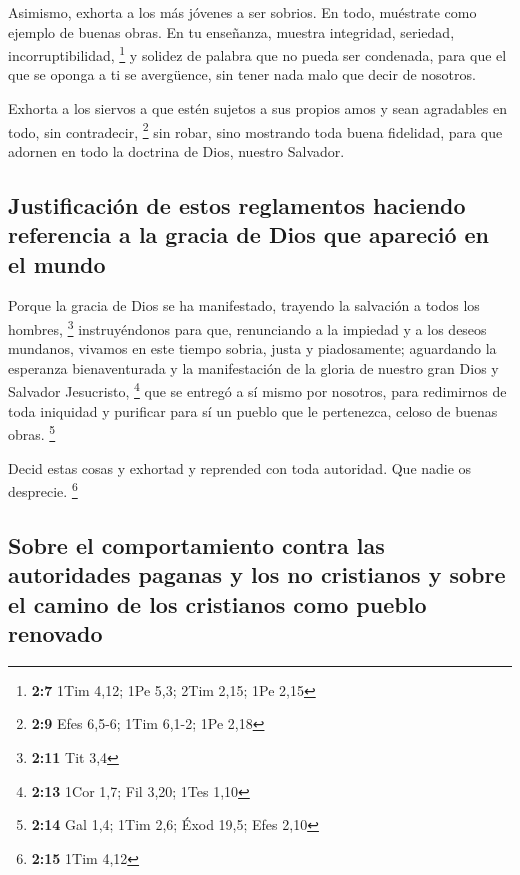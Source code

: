  Asimismo, exhorta a los más jóvenes a ser sobrios.
 En todo, muéstrate como ejemplo de buenas obras. En tu
enseñanza, muestra integridad, seriedad, incorruptibilidad, \footnote{\textbf{2:7}
  1Tim 4,12; 1Pe 5,3; 2Tim 2,15; 1Pe 2,15}  y solidez de
palabra que no pueda ser condenada, para que el que se oponga a ti se
avergüence, sin tener nada malo que decir de nosotros.

 Exhorta a los siervos a que estén sujetos a sus propios
amos y sean agradables en todo, sin contradecir, \footnote{\textbf{2:9}
  Efes 6,5-6; 1Tim 6,1-2; 1Pe 2,18}  sin robar, sino
mostrando toda buena fidelidad, para que adornen en todo la doctrina de
Dios, nuestro Salvador.

\hypertarget{justificaciuxf3n-de-estos-reglamentos-haciendo-referencia-a-la-gracia-de-dios-que-apareciuxf3-en-el-mundo}{%
\subsection{Justificación de estos reglamentos haciendo referencia a la
gracia de Dios que apareció en el
mundo}\label{justificaciuxf3n-de-estos-reglamentos-haciendo-referencia-a-la-gracia-de-dios-que-apareciuxf3-en-el-mundo}}

 Porque la gracia de Dios se ha manifestado, trayendo la
salvación a todos los hombres, \footnote{\textbf{2:11} Tit 3,4}
 instruyéndonos para que, renunciando a la impiedad y a
los deseos mundanos, vivamos en este tiempo sobria, justa y
piadosamente;  aguardando la esperanza bienaventurada y
la manifestación de la gloria de nuestro gran Dios y Salvador
Jesucristo, \footnote{\textbf{2:13} 1Cor 1,7; Fil 3,20; 1Tes 1,10}
 que se entregó a sí mismo por nosotros, para redimirnos
de toda iniquidad y purificar para sí un pueblo que le pertenezca,
celoso de buenas obras. \footnote{\textbf{2:14} Gal 1,4; 1Tim 2,6; Éxod
  19,5; Efes 2,10}

 Decid estas cosas y exhortad y reprended con toda
autoridad. Que nadie os desprecie. \footnote{\textbf{2:15} 1Tim 4,12}

\hypertarget{sobre-el-comportamiento-contra-las-autoridades-paganas-y-los-no-cristianos-y-sobre-el-camino-de-los-cristianos-como-pueblo-renovado}{%
\subsection{Sobre el comportamiento contra las autoridades paganas y los
no cristianos y sobre el camino de los cristianos como pueblo
renovado}\label{sobre-el-comportamiento-contra-las-autoridades-paganas-y-los-no-cristianos-y-sobre-el-camino-de-los-cristianos-como-pueblo-renovado}}

